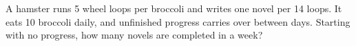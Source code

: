 A hamster runs 5 wheel loops per broccoli and writes one novel per 14 loops. It eats 10 broccoli daily, and unfinished progress carries over between days. Starting with no progress, how many novels are completed in a week?
